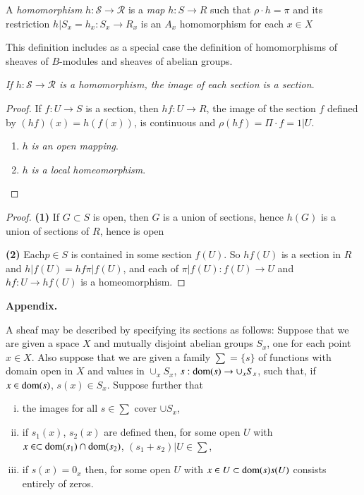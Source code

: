 \begin{defi*}
A \textit{homomorphism} $h: \mathscr{S} \to \mathscr{R}$ is a
\textit{map} $h:S \to R$ such that $\rho \cdot h = \pi$ and its restriction
$h|S_x=h_x: S_x \to R_x$ is an $A_x$ homomorphism for each $x \in X$ 
\end{defi*}

This definition includes as a special case the definition of
homomorphisms of sheaves of $B$-modules and sheaves of abelian
groups. 

\textit{If $h: \mathscr{S} \to \mathscr{R}$ is a homomorphism, the
  image of each section is a section}. 

\begin{proof}
If $f: U \to S$ is a section, then $hf:U \to R$, the image of the
section $f$ defined by $(hf)(x)=h(f(x))$, is continuous and $\rho (hf)
= \Pi \cdot f=1|U$. 
\begin{enumerate}[(1)]
\item $h$ \textit{is an open mapping}.

\item $h$ \textit{is a local homeomorphism}.
\end{enumerate}
\end{proof}

\begin{proof}
\textbf{(1)} If $G \subset S$ is open, then $G$ is a union of sections, hence
  $h(G)$ is a union of sections of $R$, hence is open  

\textbf{(2)} Each\pageoriginale $p\in S$ is contained in some section
$f(U)$. So $hf(U)$ is a section in $R$ and $ h | f(U) = hf \pi
| f(U)$, and each of $\pi | f(U) : f(U) \rightarrow U$ and $hf :
U \rightarrow hf(U)$ is a homeomorphism. 
\end{proof}

\noindent
\textbf{Appendix.}

A sheaf may be described by specifying its sections as follows:
Suppose that we are given a space $X$ and mutually disjoint abelian
groups $S_x$, one for each point $x \in X$. Also suppose that we
are given a family $\sum = \{ s\}$ of functions with domain open in
$X$ and values in $\cup_x S_x$, $s: \operatorname{dom} (s) \rightarrow \cup_x 
S_x$, such that, if $x \in \operatorname{dom}  (s)$, $s(x) \in S_x$. Suppose
further that 
\begin{enumerate}[(i)]
\item the images for all $s \in \sum$ cover $\cup S_x$,

\item if $s_1  (x)$, $s_2 (x) $ are defined then, for some open $U$ with
  $x  \in \subset\break \dom (s_1) \cap\dom  (s_2)$, $(s_1 + s_2) |  U
   \in  \sum$, 

\item if $s(x) = 0_x$ then, for some open $U$ with $x \in U 
  \subset \operatorname{dom} (s) s(U)$ consists entirely of zeros. 
\end{enumerate}

